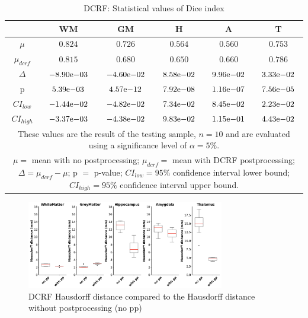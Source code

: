 \documentclass[journal]{IEEEtran}
\begin{document}
\begin{table}[ht]
\renewcommand{\arraystretch}{1.3}
\caption{DCRF: Statistical values of Dice index}
\label{tbl_dcrf_dice}
\centering
\tabcolsep=0.11cm
\begin{tabular}{c|c|c|c|c|c}
\hline
 & WM & GM & H & A & T\\
\hline
$\mu$&$0.824$&$0.726$&$0.564$&$0.560$&$0.753$\\
$\mu_{dcrf}$&$0.815$&$0.680$&$0.650$&$0.660$&$0.786$\\
$\Delta$&${-8.90}\mathrm{e}{-03}$&${-4.60}\mathrm{e}{-02}$&${8.58}\mathrm{e}{-02}$&${9.96}\mathrm{e}{-02}$&${3.33}\mathrm{e}{-02}$\\
p&${5.39}\mathrm{e}{-03}$&${4.57}\mathrm{e}{-12}$&${7.92}\mathrm{e}{-08}$&${1.16}\mathrm{e}{-07}$&${7.56}\mathrm{e}{-05}$\\
$CI_{low}$&${-1.44}\mathrm{e}{-02}$&${-4.82}\mathrm{e}{-02}$&${7.34}\mathrm{e}{-02}$&${8.45}\mathrm{e}{-02}$&${2.23}\mathrm{e}{-02}$\\
$CI_{high}$&${-3.37}\mathrm{e}{-03}$&${-4.38}\mathrm{e}{-02}$&${9.83}\mathrm{e}{-02}$&${1.15}\mathrm{e}{-01}$&${4.43}\mathrm{e}{-02}$\\
\hline
\multicolumn{6}{p{3.4in}}{These values are the result of the testing sample, $n=10$ and are evaluated using a significance level of $\alpha = 5\%$. }\\
\multicolumn{6}{p{3.4in}}{$\mu=$ mean with no postprocessing; $\mu_{dcrf}=$ mean with DCRF postprocessing; $\Delta=\mu_{dcrf}-\mu$; p $=$ p-value;  $CI_{low}= 95\%$ confidence interval lower bound; $CI_{high}= 95\%$ confidence interval upper bound.}\\

\end{tabular}
\end{table}



\begin{figure}[ht]
\centering
\includegraphics[width=3.4in]{MIALab_Report/img/boxplots/DCRF-HD.png}
\caption{DCRF Hausdorff distance compared to the Hausdorff distance without postprocessing (no pp)}
\label{fig_dcrf-hd}
\end{figure}
\end{document}
